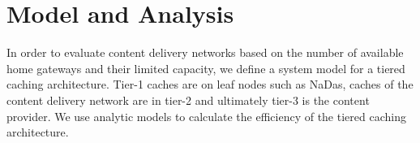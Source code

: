 \section{Model and Analysis}\label{sec:model}

In order to evaluate content delivery networks based on the number of available home gateways and their limited capacity, we define a system model for a tiered caching architecture.
Tier-1 caches are on leaf nodes such as NaDas, caches of the content delivery network are in tier-2 and ultimately tier-3 is the content provider.
We use analytic models to calculate the efficiency of the tiered caching architecture.





